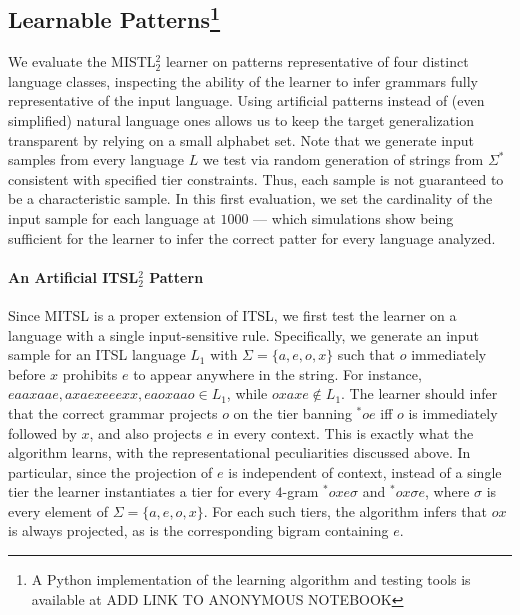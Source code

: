 \documentclass[11pt,a4paper]{article}
\begin{document}
\subsection{Learnable Patterns\footnote{A Python implementation of the learning algorithm and testing tools is available at ADD LINK TO ANONYMOUS NOTEBOOK}}

We evaluate the  MISTL$^2_2$ learner on patterns representative of  four distinct  language classes,  inspecting the ability of the learner to infer grammars fully representative of the input language.
Using artificial patterns instead of (even simplified) natural language ones allows us to keep the target generalization transparent by relying on a small alphabet set.
Note that we generate input samples from every language $L$ we test via random generation of strings from $\Sigma^*$ consistent with specified tier constraints.
Thus, each sample is not guaranteed to be a characteristic sample.
In this first evaluation, we set the cardinality of the input sample for each language at $1000$ --- which simulations show being sufficient for the learner to infer the correct patter for every language analyzed.


\paragraph{An Artificial ITSL$^2_2$ Pattern} Since MITSL is a proper extension of ITSL, we first test the learner on a language with a single input-sensitive rule.  Specifically, we generate an input sample for an ITSL language $L_1$ with $\Sigma = \{a, e, o, x\}$ such that $o$ immediately before $x$ prohibits $e$ to appear anywhere in the string. 
For instance,  $eaaxaae,axaexeeexx,eaoxaao \in L_1$, while $oxaxe \notin L_1$.
The learner should infer that the correct grammar projects $o$ on the tier banning $^*oe$ iff $o$ is immediately followed by $x$, and also projects $e$ in every context.
This is exactly what the algorithm learns, with the representational peculiarities discussed above.
In particular, since the projection of $e$ is independent of context, instead of a single tier the learner instantiates a tier for every $4$-gram  $^*oxe\sigma$ and   $^*ox\sigma e$, where $\sigma$ is every element of $\Sigma = \{a, e, o, x\}$.
For each such tiers, the algorithm infers that $ox$ is always projected, as is the corresponding bigram containing $e$.
\end{document}
